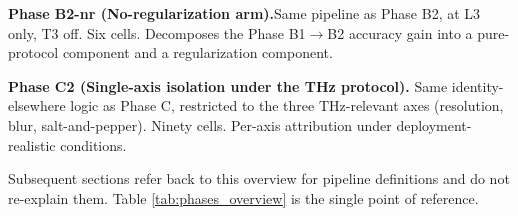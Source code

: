 \textbf{Phase B2-nr (No-regularization arm).}\quad Same pipeline as
Phase B2, at L3 only, T3 off. Six cells. Decomposes the
Phase B1$\to$B2 accuracy gain into a pure-protocol component and a
regularization component.

\textbf{Phase C2 (Single-axis isolation under the THz protocol).}\quad
Same identity-elsewhere logic as Phase C, restricted to the three
THz-relevant axes (resolution, blur, salt-and-pepper). Ninety cells.
Per-axis attribution under deployment-realistic conditions.



Subsequent sections refer back to this overview for pipeline
definitions and do not re-explain them. Table \ref{tab:phases_overview}
is the single point of reference.
